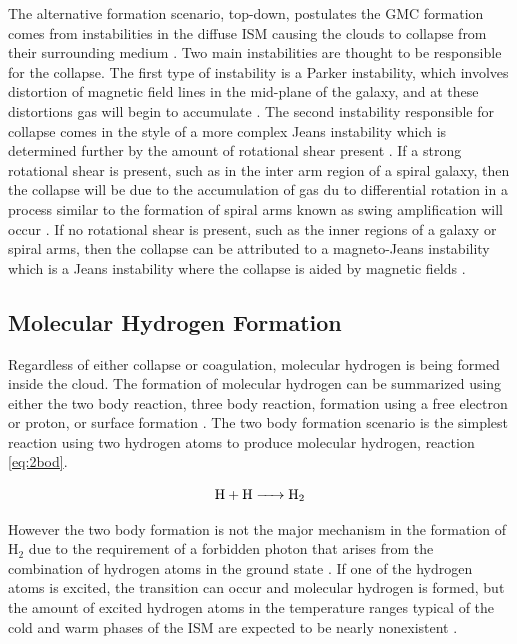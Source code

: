 The alternative formation scenario, top-down, postulates the GMC formation comes from instabilities in the diffuse ISM causing the clouds to collapse from their surrounding medium \citep{mckee2007}.  Two main instabilities are thought to be responsible for the collapse.  The first type of instability is a Parker instability, which involves distortion of magnetic field lines in the mid-plane of the galaxy, and at these distortions gas will begin to accumulate \citep{parker1966, dobbs2013}.  The second instability responsible for collapse comes in the style of a more complex Jeans instability which is determined further by the amount of rotational shear present \citep{mckee2007}.  If a strong rotational shear is present, such as in the inter arm region of a spiral galaxy, then the collapse will be due to the accumulation of gas du to differential rotation in a process similar to the formation of spiral arms known as swing amplification will occur \citep{mckee2007, dobbs2012}.  If no rotational shear is present, such as the inner regions of a galaxy or spiral arms, then the collapse can be attributed to a magneto-Jeans instability which is a Jeans instability where the collapse is aided by magnetic fields \citep{elmegreen1987,kim2001}.

\subsection{Molecular Hydrogen Formation}\label{h2form}

Regardless of either collapse or coagulation, molecular hydrogen is being formed inside the cloud.  The formation of molecular hydrogen can be summarized using either the two body reaction, three body reaction, formation using a free electron or proton, or surface formation \citep{krumholz2014}.  The two body formation scenario is the simplest reaction using two hydrogen atoms to produce molecular hydrogen, reaction \ref{eq:2bod}.

\begin{equation}\label{eq:2bod}
  \ce{H + H -> H_2}
\end{equation}

However the two body formation is not the major mechanism in the formation of H$_2$ due to the requirement of a forbidden photon that arises from the combination of hydrogen atoms in the ground state \citep{gould1963}.  If one of the hydrogen atoms is excited, the transition can occur and molecular hydrogen is formed, but the amount of excited hydrogen atoms in the temperature ranges typical of the cold and warm phases of the ISM are expected to be nearly nonexistent \citep{krumholz2014}.

